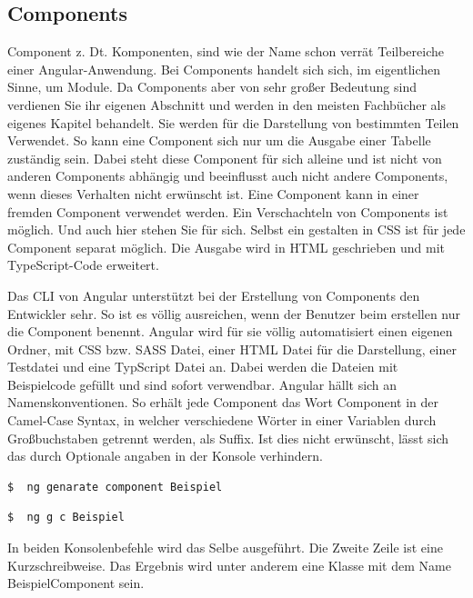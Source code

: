 \subsection{Components}
\label{cha:components}
Component \ac{z. Dt.} Komponenten, sind wie der Name schon verrät Teilbereiche einer Angular-Anwendung. Bei Components handelt sich sich, im eigentlichen Sinne, um Module. Da Components aber von sehr großer Bedeutung sind verdienen Sie ihr eigenen Abschnitt und werden in den meisten Fachbücher als eigenes Kapitel behandelt. Sie werden für die Darstellung von bestimmten Teilen Verwendet. So kann eine Component sich nur um die Ausgabe einer Tabelle zuständig sein. Dabei steht diese Component für sich alleine und ist nicht von anderen Components abhängig und beeinflusst auch nicht andere Components, wenn dieses Verhalten nicht erwünscht ist. Eine Component kann in einer fremden Component verwendet werden. Ein Verschachteln von Components ist möglich. Und auch hier stehen Sie für sich. Selbst ein gestalten in \ac{CSS} ist für jede Component separat möglich. Die Ausgabe wird in \ac{HTML} geschrieben und mit TypeScript-Code erweitert.\autocite{Clow.2018}

Das \ac{CLI} von Angular unterstützt bei der Erstellung von Components den Entwickler sehr. So ist es völlig ausreichen, wenn der Benutzer beim erstellen nur die Component benennt. Angular wird für sie völlig automatisiert einen eigenen Ordner, mit \ac{CSS} bzw. \ac{SASS} Datei, einer \ac{HTML} Datei für die Darstellung, einer Testdatei und eine TypScript Datei an. Dabei werden die Dateien mit Beispielcode gefüllt und sind sofort verwendbar. Angular hällt sich an Namenskonventionen. So erhält jede Component das Wort Component in der Camel-Case Syntax, in welcher verschiedene Wörter in einer Variablen durch Großbuchstaben getrennt werden, als Suffix. Ist dies nicht erwünscht, lässt sich das durch Optionale angaben in der Konsole verhindern.

\begin{lstlisting}[language=sh, frame=single]
$  ng genarate component Beispiel
\end{lstlisting} 

\begin{lstlisting}[language=sh, frame=single]
$  ng g c Beispiel
\end{lstlisting}

In beiden Konsolenbefehle wird das Selbe ausgeführt. Die Zweite Zeile ist eine Kurzschreibweise. Das Ergebnis wird unter anderem eine Klasse mit dem Name BeispielComponent sein. 

